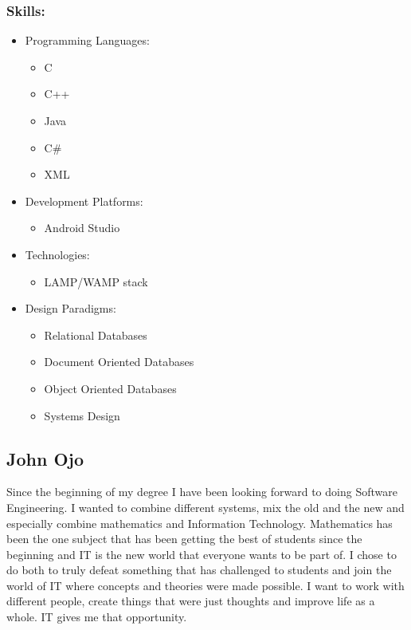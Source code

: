 \documentclass[12pt]{article}
\begin{document}
	\subsubsection{Skills:} 
	\begin{itemize}
	\item Programming Languages:
	\begin{itemize}
	\item C
	\item C++
	\item Java
	\item C\#
	\item XML
	\end{itemize}
	\item Development Platforms:
	\begin{itemize}
	\item Android Studio
	\end{itemize}
	\item Technologies:
	\begin{itemize}
	\item LAMP/WAMP stack
	\end{itemize}
	\item Design Paradigms:
	\begin{itemize}
	\item Relational Databases
	\item Document Oriented Databases
	\item Object Oriented Databases
	\item Systems Design
	\end{itemize}
	\end{itemize}
	
	\subsection{John Ojo}
	Since the beginning of my degree I have been looking forward to doing Software Engineering. I wanted to combine different systems, mix the old and the new and especially combine mathematics and Information Technology. Mathematics has been the one subject that has been getting the best of students since the beginning and IT is the new world that everyone wants to be part of. I chose to do both to truly defeat something that has challenged to students and join the world of IT where concepts and theories were made possible. I want to work with different people, create things that were just thoughts and improve life as a whole. IT gives me that opportunity.
\end{document}
